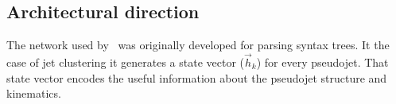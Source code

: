 %
%
%
%
%

\subsection{Architectural direction}
The network used by~\cite{cheng_recursive_2018} was originally developed for parsing syntax trees.
It the case of jet clustering it generates a state vector (\(\vec{h}_k\)) for every pseudojet.
That state vector encodes the useful information about the pseudojet structure and kinematics.

